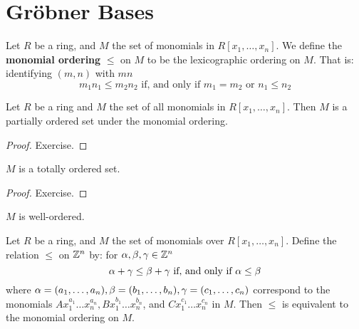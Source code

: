 \section{Gr\"obner Bases}
\label{section_7.5}

\begin{definition}
  Let $R$ be a ring, and  $M$ the set of monomials in  $R[x_1, \dots,
  x_n]$. We define the \textbf{monomial ordering} $\leq$ on $M$ to be
  the lexicographic ordering on $M$. That is: identifying $(m,n)$ with
  $mn$
  \begin{equation*}
    m_1n_1 \leq m_2n_2 \text{ if, and only if }
    m_1=m_2 \text{ or }  n_1 \leq n_2
  \end{equation*}
\end{definition}

\begin{lemma}\label{lemma_7.5.2}
  Let $R$ be a ring and  $M$ the set of all monomials in  $R[x_1,
  \dots, x_n]$. Then $M$ is a partially ordered set under the monomial
  ordering.
\end{lemma}
\begin{proof}
  Exercise.
\end{proof}
\begin{corollary}
  $M$ is a totally ordered set.
\end{corollary}
\begin{proof}
  Exercise.
\end{proof}
\begin{corollary}
  $M$ is well-ordered.
\end{corollary}

\begin{lemma}\label{7.5.3}
  Let $R$ be a ring, and $M$ the set of monomials over $R[x_1, \dots,
  x_n]$. Define the relation $\leq$ on $\mathbb{Z}^n$ by: for $\alpha,\beta,\gamma \in
  \mathbb{Z}^n$
  \begin{equation*}
    \alpha+\gamma \leq \beta+\gamma \text{ if, and only if } \alpha \leq \beta
  \end{equation*}
  where $\alpha=(a_1, \dots ,a_n), \beta=(b_1, \dots, b_n), \gamma=(c_1, \dots,
  c_n)$ correspond to the monomials $Ax_1^{a_1} \dots x_n^{a_n},
  Bx_1^{b_1} \dots x_n^{b_n}$, and $Cx_1^{c_1} \dots x_n^{c_n}$ in
  $M$. Then $\leq$ is equivalent to the monomial ordering on $M$.
\end{lemma}
